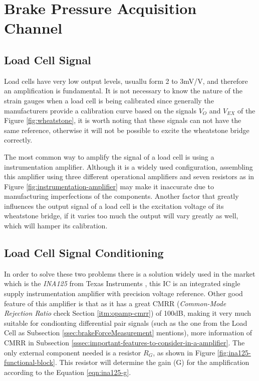 \section{Brake Pressure Acquisition Channel}\label{sec:brake-pressure-acquisition-channel}

\subsection{Load Cell Signal}\label{ssec:load-cell-signal}

	Load cells have very low output levels, usuallu form 2 to 3mV/V, and therefore an amplification is fundamental. It is not necessary to know the nature of the strain gauges when a load cell is being calibrated since generally the manufacturers provide a calibration curve based on the signals $V_{O}$ and $V_{EX}$ of the Figure \ref{fig:wheatstone}, it is worth noting that these signals can not have the same reference, otherwise it will not be possible to excite the wheatstone bridge correctly.
	\par
	The most common way to amplify the signal of a load cell is using a instrumentation amplifier. Although it is a widely used configuration, assembling this amplifier using three different operational amplifiers and seven resistors as in Figure \ref{fig:instrumentation-amplifier} may make it inaccurate due to manufacturing imperfections of the components. Another factor that greatly influences the output signal of a load cell is the excitation voltage of its wheatstone bridge, if it varies too much the output will vary greatly as well, which will hamper its calibration.

\subsection{Load Cell Signal Conditioning}\label{ssec:load-cell-signal-conditioning}
		
	In order to solve these two problems there is a solution widely used in the market which is the \textit{INA125} from Texas Instruments \cite{ina125}, this IC is an integrated single supply instrumentation amplifier with precision voltage reference. Other good feature of this amplifier is that as it has a great CMRR (\textit{Common-Mode Rejection Ratio} check Section \ref{itm:opamp-cmrr}) of 100dB, making it very much suitable for condionting differential pair signals (such as the one from the Load Cell as Subsection \ref{ssec:brakeForceMeasurement} mentions), more information of CMRR in Subsection \ref{sssec:important-features-to-consider-in-a-amplifier}. The only external component needed is a resistor $R_{G}$, as shown in Figure \ref{fig:ina125-functional-block}. This resistor will determine the gain (G) for the amplification according to the Equation \ref{eqn:ina125-g}.
	

